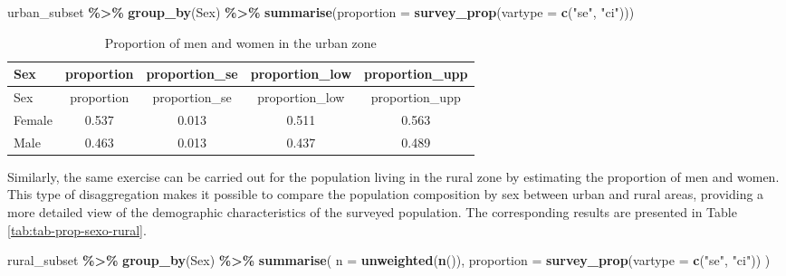 \documentclass[
  english,
  12pt,
]{book}
\newenvironment{Shaded}{\begin{snugshade}}{\end{snugshade}}
\newcommand{\AttributeTok}[1]{\textcolor[rgb]{0.13,0.29,0.53}{#1}}
\newcommand{\FunctionTok}[1]{\textcolor[rgb]{0.13,0.29,0.53}{\textbf{#1}}}
\newcommand{\NormalTok}[1]{#1}
\newcommand{\SpecialCharTok}[1]{\textcolor[rgb]{0.81,0.36,0.00}{\textbf{#1}}}
\newcommand{\StringTok}[1]{\textcolor[rgb]{0.31,0.60,0.02}{#1}}
\begin{document}
\begin{Shaded}
\begin{Highlighting}[]
\NormalTok{urban\_subset }\SpecialCharTok{\%\textgreater{}\%}
  \FunctionTok{group\_by}\NormalTok{(Sex) }\SpecialCharTok{\%\textgreater{}\%}
  \FunctionTok{summarise}\NormalTok{(}\AttributeTok{proportion =} \FunctionTok{survey\_prop}\NormalTok{(}\AttributeTok{vartype =} \FunctionTok{c}\NormalTok{(}\StringTok{"se"}\NormalTok{, }\StringTok{"ci"}\NormalTok{)))}
\end{Highlighting}
\end{Shaded}

\begin{longtable}[]{@{}lcccc@{}}
\caption{\label{tab:tab-prop-sexo-urbano}Proportion of men and women in the urban zone}\tabularnewline
\toprule\noalign{}
Sex & proportion & proportion\_se & proportion\_low & proportion\_upp \\
\midrule\noalign{}
\endfirsthead
\toprule\noalign{}
Sex & proportion & proportion\_se & proportion\_low & proportion\_upp \\
\midrule\noalign{}
\endhead
\bottomrule\noalign{}
\endlastfoot
Female & 0.537 & 0.013 & 0.511 & 0.563 \\
Male & 0.463 & 0.013 & 0.437 & 0.489 \\
\end{longtable}

Similarly, the same exercise can be carried out for the population living in the rural zone by estimating the proportion of men and women. This type of disaggregation makes it possible to compare the population composition by sex between urban and rural areas, providing a more detailed view of the demographic characteristics of the surveyed population. The corresponding results are presented in Table \ref{tab:tab-prop-sexo-rural}.

\begin{Shaded}
\begin{Highlighting}[]
\NormalTok{rural\_subset }\SpecialCharTok{\%\textgreater{}\%}
  \FunctionTok{group\_by}\NormalTok{(Sex) }\SpecialCharTok{\%\textgreater{}\%}
  \FunctionTok{summarise}\NormalTok{(}
    \AttributeTok{n =} \FunctionTok{unweighted}\NormalTok{(}\FunctionTok{n}\NormalTok{()),}
    \AttributeTok{proportion =} \FunctionTok{survey\_prop}\NormalTok{(}\AttributeTok{vartype =} \FunctionTok{c}\NormalTok{(}\StringTok{"se"}\NormalTok{, }\StringTok{"ci"}\NormalTok{))}
\NormalTok{  )}
\end{Highlighting}
\end{Shaded}
\end{document}
